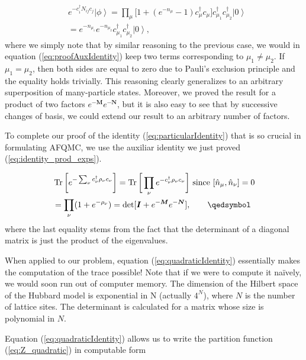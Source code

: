 \begin{equation}
\begin{split}
&e^{-c_i^\dagger N_{ij} c_j} \left| \phi \right\rangle = \prod_\mu \bigg[ 1 + (e^{-n_\mu} -1 ) c_\mu^\dagger c_\mu \bigg] c_{\mu_1}^\dagger c_{\mu_2}^\dagger \left| 0 \right\rangle \\
&= e^{-n_{\mu_1}} e^{-n_{\mu_2}} c_{\mu_1}^\dagger c_{\mu_2}^\dagger \left| 0 \right\rangle ,
\end{split}
\end{equation}
where we simply note that by similar reasoning to the previous case, we would in equation (\ref{eq:proofAuxIdentity}) keep two terms corresponding to $\mu_1 \neq \mu_2$. If $\mu_1 = \mu_2$, then both sides are equal to zero due to Pauli's exclusion principle and the equality holds trivially. This reasoning clearly generalizes to an arbitrary superposition of many-particle states. Moreover, we proved the result for a product of two factors $e^{-\bm M} e^{-\bm N}$, but it is also easy to see that by successive changes of basis, we could extend our result to an arbitrary number of factors.

To complete our proof of the identity (\ref{eq:particularIdentity}) that is so crucial in formulating AFQMC, we use the auxiliar identity we just proved (\ref{eq:identity_prod_exps}).

\begin{equation}\label{eq:completeProof}
\begin{split}
&\Tr \bigg[ e^{-\sum_\nu c_\nu^\dagger \rho_\nu c_\nu} \bigg] = \Tr \bigg[ \prod_\nu e^{-c_\nu^\dagger \rho_\nu c_\nu } \bigg] \text{  since  } [\hat{n}_\mu, \hat{n}_\nu] = 0 \\
&= \prod_\nu ( 1 + e^{-\rho_\nu} ) = \text{det} [ \bm I + e^{-\bm M} e^{-\bm N} ], \quad\quad \qedsymbol
\end{split}
\end{equation}
where the last equality stems from the fact that the determinant of a diagonal matrix is just the product of the eigenvalues.

When applied to our problem, equation (\ref{eq:quadraticIdentity}) essentially makes the computation of the trace possible! Note that if we were to compute it na\"ively, we would soon run out of computer memory. The dimension of the Hilbert space of the Hubbard model is exponential in N (actually $4^N$), where $N$ is the number of lattice sites. The determinant is calculated for a matrix whose size is polynomial in $N$. 

Equation (\ref{eq:quadraticIdentity}) allows us to write the partition function (\ref{eq:Z_quadratic}) in computable form

